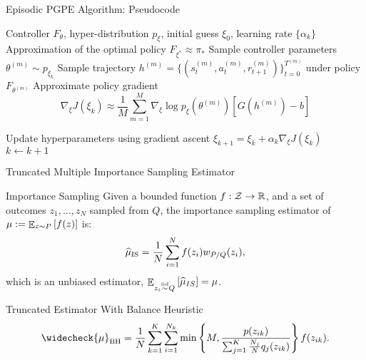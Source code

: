 \begin{frame}{Episodic PGPE Algorithm: Pseudocode}
	\begin{algorithmic}[1]
		\Require Controller $F_\theta$, hyper-distribution $p_\xi$, initial guess $\xi_0$, learning rate $\{\alpha_k\}$
		\Ensure Approximation of the optimal policy $F_{\xi^*} \approx \pi_*$
		\Repeat
				\State Sample controller parameters $\theta^{(m)} \sim p_{\xi_k}$ 
				\State Sample trajectory $h^{(m)} = \{(s_t^{(m)}, a_t^{(m)}, r_{t+1}^{(m)})\}_{t = 0}^{T^{(m)}}$ under policy $F_{\theta^{(m)}}$
			\EndFor
			\State Approximate policy gradient 
		  		\begin{equation*}
		  		\nabla_\xi J(\xi_k) \approx \frac{1}{M} \sum^{M}_{m=1} \nabla_\xi \log p_\xi\left(\theta^{(m)}\right) \left[G\left(h^{(m)}\right)-b\right] 
		  		\end{equation*}
		  		
			\State Update hyperparameters using gradient ascent $\xi_{k+1} = \xi_k + \alpha_k \nabla_\xi J(\xi_k)$
			\State $k \leftarrow k + 1$
	\end{algorithmic}
\end{frame}

\begin{frame}{Truncated Multiple Importance Sampling Estimator}

\begin{block}{Importance Sampling}
Given a bounded function $f:\mathcal{Z}\to\mathbb{R}$, and a set of \iid outcomes $z_1,\dots,z_N$ sampled from $Q$, the importance sampling estimator of $\mu:=\mathop{\mathbb{E}}_{z\sim P}\left[f(z)\right]$ is:
\begin{equation}\label{eq:ise}
	\widehat{\mu}_{\text{IS}} = \frac{1}{N}\sum_{i=1}^{N}f(z_i)w_{P/Q}(z_i),
\end{equation}
which is an unbiased estimator, \ie ${\mathop{\mathbb{E}}_{z_i\stackrel{\text{iid}}{\sim} Q}\left[\widehat{\mu}_{IS}\right] = \mu}$.
\end{block}

\begin{block}{Truncated Estimator With Balance Heuristic}
\begin{equation}\label{eq:truncatedmise}
	\widecheck{\mu}_{\text{BH}} =\frac{1}{N} \sum_{k=1}^K\sum_{i=1}^{N_k} \min \left\{M,  \frac{p(z_{ik})}{\sum_{j=1}^K \frac{N_j}{N} q_j(z_{ik})} \right\} f(z_{ik}).
\end{equation}
\end{block}

\end{frame}

